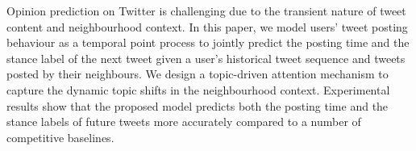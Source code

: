 Opinion prediction on Twitter is challenging due to the transient nature of tweet content and neighbourhood context. In this paper, we model users' tweet posting behaviour as a temporal point process to jointly predict the posting time and the stance label of the next tweet given a user's historical tweet sequence and tweets posted by their neighbours. We design a topic-driven attention mechanism to capture the dynamic topic shifts in the neighbourhood context. Experimental results show that the proposed model predicts both the posting time and the stance labels of future tweets more accurately compared to a number of competitive baselines.
